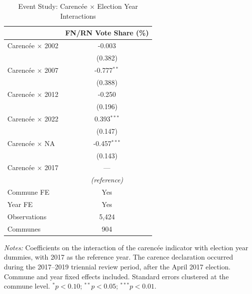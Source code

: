 \begin{table}[t]
\centering
\caption{Event Study: Carencée $\times$ Election Year Interactions}
\label{tab:eventstudy}
\small
\begin{tabular}{lc}
\toprule
 & FN/RN Vote Share (\%) \\
\midrule
Carenc\'{e}e $\times$ 2002 & -0.003 \\
 & (0.382) \\
Carenc\'{e}e $\times$ 2007 & -0.777$^{**}$ \\
 & (0.388) \\
Carenc\'{e}e $\times$ 2012 & -0.250 \\
 & (0.196) \\
Carenc\'{e}e $\times$ 2022 & 0.393$^{***}$ \\
 & (0.147) \\
Carenc\'{e}e $\times$ NA & -0.457$^{***}$ \\
 & (0.143) \\
Carenc\'{e}e $\times$ 2017 & \multicolumn{1}{c}{---} \\
 & \multicolumn{1}{c}{\textit{(reference)}} \\
\midrule
Commune FE & Yes \\
Year FE & Yes \\
Observations & 5,424 \\
Communes & 904 \\
\bottomrule
\end{tabular}
\begin{tablenotes}
\item \textit{Notes:} Coefficients on the interaction of the carenc\'{e}e indicator with election year dummies, with 2017 as the reference year. The carence declaration occurred during the 2017--2019 triennial review period, after the April 2017 election. Commune and year fixed effects included. Standard errors clustered at the commune level. $^{*}p<0.10$; $^{**}p<0.05$; $^{***}p<0.01$.
\end{tablenotes}
\end{table}
